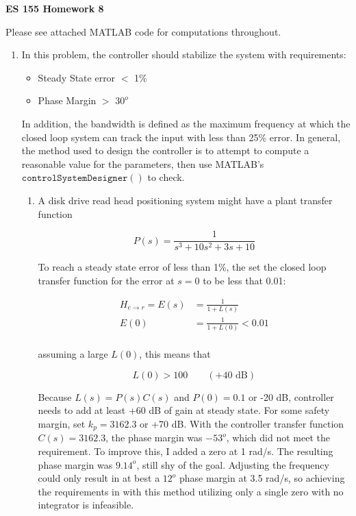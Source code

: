 \documentclass[11pt]{article}
\theoremstyle{definition}
\begin{document}
\textbf{\huge{ES 155 Homework 8}}    %
\normalsize

Please see attached MATLAB code for computations throughout.

\begin{enumerate}

    \item %
    In this problem, the controller should stabilize the system with requirements:
    \begin{itemize}
        \item Steady State error $<$ 1\%
        \item Phase Margin $>$ $30^o$
    \end{itemize}
    In addition, the bandwidth is defined as the maximum frequency at which the closed loop system can track the input with less than 25\% error.  In general, the method used to design the controller is to attempt to compute a reasonable value for the parameters, then use MATLAB's $\mathtt{controlSystemDesigner()}$ to check.

    \begin{enumerate}
        \item %
        A disk drive read head positioning system might have a plant transfer function

        $$ P(s) = \frac{1}{s^3 + 10s^2 + 3s + 10} $$

        To reach a steady state error of less than 1\%, the set the closed loop transfer function for the error at $s = 0$ to be less that 0.01:

        \begin{align*}
            H_{e\rightarrow r} = E(s) &= \frac{1}{1+L(s)} \\
            E(0) &= \frac{1}{1+L(0)} < 0.01 \\
        \end{align*}

        assuming a large $L(0)$, this means that

        $$ L(0) > 100 \quad\quad (+40 \text{ dB}) $$

        Because $L(s) = P(s)C(s)$ and $P(0) = 0.1$ or -20 dB, controller needs to add at least +60 dB of gain at steady state.  For some safety margin, set $k_p = 3162.3$ or +70 dB.  With the controller transfer function $C(s) = 3162.3$, the phase margin was $-53^o$, which did not meet the requirement.  To improve this, I added a zero at 1 rad/s.  The resulting phase margin was $9.14^o$, still shy of the goal.  Adjusting the frequency could only result in at best a $12^o$ phase margin at 3.5 rad/s, so achieving the requirements in with this method utilizing only a single zero with no integrator is infeasible.


\end{enumerate}
\end{enumerate}
\end{document}
